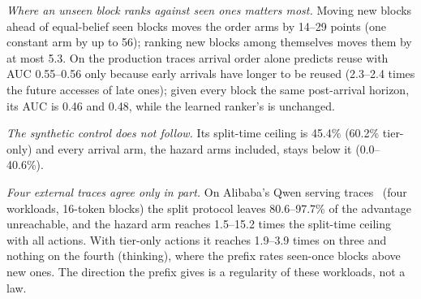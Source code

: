 \emph{Where an unseen block ranks against seen ones matters most.} Moving new blocks ahead of
equal-belief seen blocks moves the order arms by 14--29 points (one constant arm by up to 56);
ranking new blocks among themselves moves them by at most 5.3. On the production traces arrival order alone predicts reuse with AUC 0.55--0.56 only because early arrivals
have longer to be reused (2.3--2.4 times the future accesses of late ones); given every block the same
post-arrival horizon, its AUC is 0.46 and 0.48, while the learned ranker's is unchanged.

\emph{The synthetic control does not follow.} Its split-time ceiling is 45.4\% (60.2\% tier-only) and every
arrival arm, the hazard arms included, stays below it (0.0--40.6\%).

\emph{Four external traces agree only in part.} On Alibaba's Qwen serving traces~\cite{wang2025kvcachewild}
(four workloads, 16-token blocks) the split protocol leaves 80.6--97.7\% of the advantage
unreachable, and the hazard arm reaches 1.5--15.2 times the split-time ceiling with all
actions. With tier-only actions it reaches 1.9--3.9 times on three and nothing on the
fourth (thinking), where the prefix rates seen-once blocks above new ones. The direction the prefix gives is
a regularity of these workloads, not a law.

